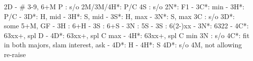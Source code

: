2D - # 3-9, 6+M
P  : s/o
2M/3M/4H*: P/C
4S : s/o
2N*: F1
   - 3C*: min
        - 3H*: P/C 
   - 3D*: H, mid
   - 3H*: S, mid
   - 3S*: H, max
   - 3N*: S, max
3C : s/o
3D*: some 5+M, GF
   - 3H : 6+H
        - 3S : 6+S
        - 3N : 5S
   - 3S : 6(2-)xx
   - 3N*: 6322
   - 4C*: 63xx+, spl D
   - 4D*: 63xx+, spl C max
   - 4H*: 63xx+, spl C min
3N : s/o
4C*: fit in both majors, slam interest, ask
   - 4D*: H
   - 4H*: S
4D*: s/o 4M, not allowing re-raise